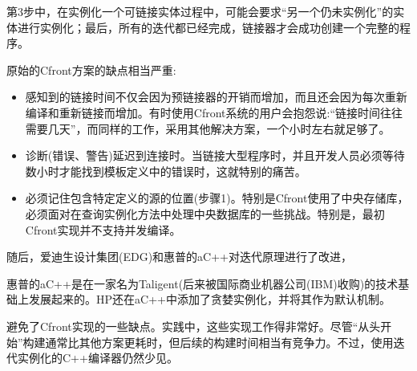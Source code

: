第3步中，在实例化一个可链接实体过程中，可能会要求“另一个仍未实例化”的实体进行实例化；最后，所有的迭代都已经完成，链接器才会成功创建一个完整的程序。

原始的Cfront方案的缺点相当严重:

\begin{itemize}
\item 
感知到的链接时间不仅会因为预链接器的开销而增加，而且还会因为每次重新编译和重新链接而增加。有时使用Cfront系统的用户会抱怨说:“链接时间往往需要几天”，而同样的工作，采用其他解决方案，一个小时左右就足够了。

\item 
诊断(错误、警告)延迟到连接时。当链接大型程序时，并且开发人员必须等待数小时才能找到模板定义中的错误时，这就特别的痛苦。

\item 
必须记住包含特定定义的源的位置(步骤1)。特别是Cfront使用了中央存储库，必须面对在查询实例化方法中处理中央数据库的一些挑战。特别是，最初Cfront实现并不支持并发编译。
\end{itemize}

随后，爱迪生设计集团(EDG)和惠普的aC++对迭代原理进行了改进，

\begin{tcolorbox}[colback=webgreen!5!white,colframe=webgreen!75!black]
\hspace*{0.75cm}惠普的aC++是在一家名为Taligent(后来被国际商业机器公司(IBM)收购)的技术基础上发展起来的。HP还在aC++中添加了贪婪实例化，并将其作为默认机制。
\end{tcolorbox}

避免了Cfront实现的一些缺点。实践中，这些实现工作得非常好。尽管“从头开始”构建通常比其他方案更耗时，但后续的构建时间相当有竞争力。不过，使用迭代实例化的C++编译器仍然少见。

















